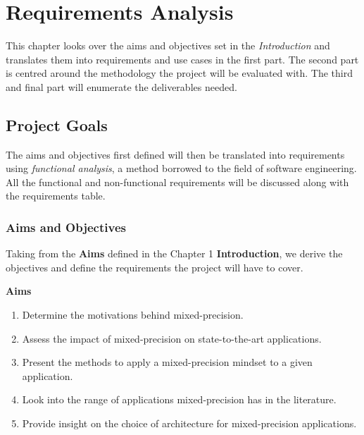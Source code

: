 \chapter{Requirements Analysis} %

\label{Chapter3} %



This chapter looks over the aims and objectives set in the \emph{Introduction} and translates them into requirements and use cases in the first part. The second part is centred around the methodology the project will be evaluated with. The third and final part will enumerate the deliverables needed.

\section{Project Goals}

The aims and objectives first defined will then be translated into requirements using \emph{functional analysis}, a method borrowed to the field of software engineering. All the functional and non-functional requirements will be discussed along with the requirements table.


\subsection{Aims and Objectives}

Taking from the \textbf{Aims} defined in the Chapter 1 \textbf{Introduction}, we derive the objectives and define the requirements the project will have to cover.

\textbf{Aims}

\begin{enumerate}
  \item Determine the motivations behind mixed-precision.
  \item Assess the impact of mixed-precision on state-to-the-art applications.
  \item Present the methods to apply a mixed-precision mindset to a given application.
  \item Look into the range of applications mixed-precision has in the literature.
  \item Provide insight on the choice of architecture for mixed-precision applications.
\end{enumerate}

